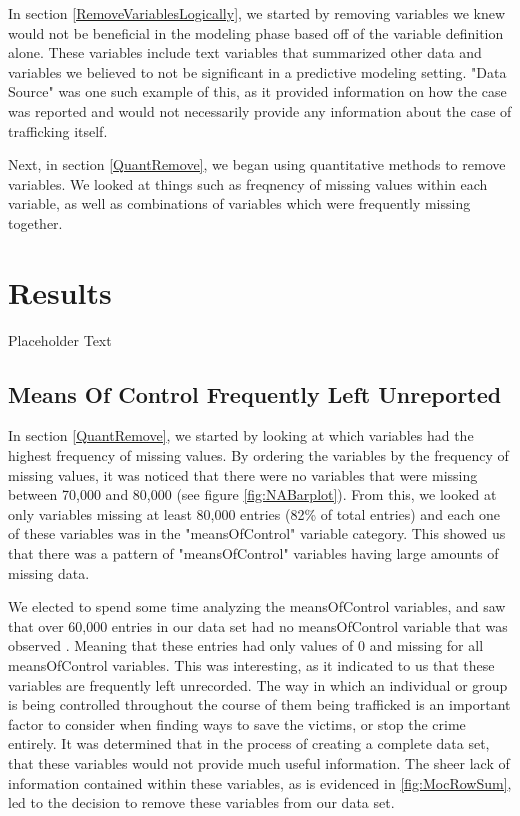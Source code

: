 \documentclass{article} %
\begin{document}
 In section \ref{RemoveVariablesLogically}, we started by removing variables we knew would not be beneficial in the modeling phase based off of the variable definition alone. These variables include text variables that summarized other data and variables we believed to not be significant in a predictive modeling setting. "Data Source" was one such example of this, as it provided information on how the case was reported and would not necessarily provide any information about the case of trafficking itself.
 
 Next, in section \ref{QuantRemove}, we began using quantitative methods to remove variables. We looked at things such as freqnency of missing values within each variable, as well as combinations of variables which were frequently missing together.
 




	\newpage
	\section{Results}
	Placeholder Text 
	
	\subsection{Means Of Control Frequently Left Unreported}
	
	 In section \ref{QuantRemove}, we started by looking at which variables had the highest frequency of missing values. By ordering the variables by the frequency of missing values, it was noticed that there were no variables that were missing between 70,000 and 80,000 (see figure \ref{fig:NABarplot}). From this, we looked at only variables missing at least 80,000 entries (82\% of total entries) and each one of these variables was in the "meansOfControl" variable category. This showed us that there was a pattern of "meansOfControl" variables having large amounts of missing data.
	
	We elected to spend some time analyzing the meansOfControl variables, and saw that over 60,000 entries in our data set had no meansOfControl variable that was observed . Meaning that these entries had only values of 0 and missing for all meansOfControl variables. This was interesting, as it indicated to us that these variables are frequently left unrecorded. The way in which an individual or group is being controlled throughout the course of them being trafficked is an important factor to consider when finding ways to save the victims, or stop the crime entirely. It was determined that in the process of creating a complete data set, that these variables would not provide much useful information. The sheer lack of information contained within these variables, as is evidenced in \ref{fig:MocRowSum}, led to the decision to remove these variables from our data set.
	
\end{document}
